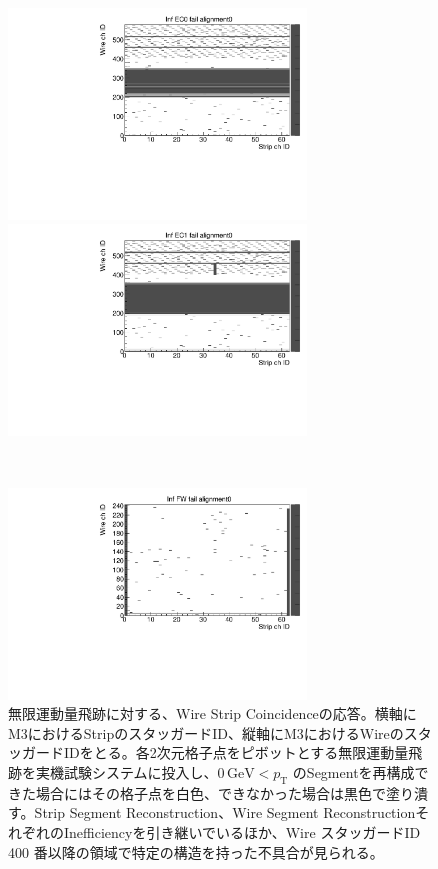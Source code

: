 \begin{figure}
    \begin{minipage}[b]{.5\linewidth}
        \centering
        \includegraphics[height=5.6cm]{fig/Test/B_InfEC0_WS.pdf}
    \end{minipage}
    \begin{minipage}[b]{.5\linewidth}
        \centering
        \includegraphics[height=5.6cm]{fig/Test/B_InfEC1_WS.pdf}
    \end{minipage}\\
    \begin{minipage}[b]{\linewidth}
        \centering
        \includegraphics[height=5.6cm]{fig/Test/B_InfFW_WS.pdf}
    \end{minipage}
    \caption[無限運動量飛跡に対する、Wire Strip Coincidenceの応答]{無限運動量飛跡に対する、Wire Strip Coincidenceの応答。横軸にM3におけるStripのスタッガードID、縦軸にM3におけるWireのスタッガードIDをとる。各2次元格子点をピボットとする無限運動量飛跡を実機試験システムに投入し、$0\,\mathrm{GeV} < p_{\mathrm{T}}$ のSegmentを再構成できた場合にはその格子点を白色、できなかった場合は黒色で塗り潰す。Strip Segment Reconstruction、Wire Segment ReconstructionそれぞれのInefficiencyを引き継いでいるほか、Wire スタッガードID 400 番以降の領域で特定の構造を持った不具合が見られる。}
    \label{Inf_B_WS}
\end{figure}




